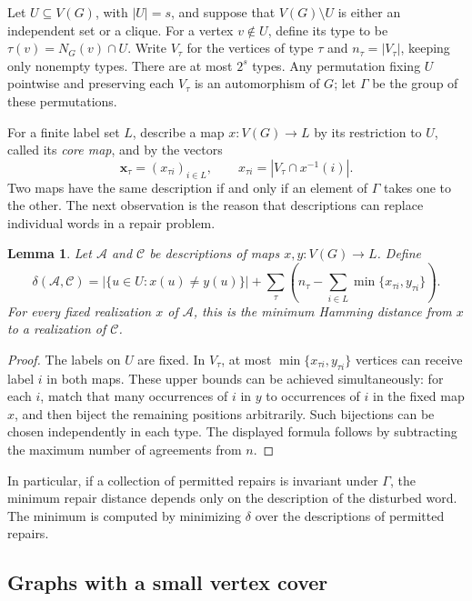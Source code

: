 \documentclass[11pt,reqno]{amsart}
\numberwithin{equation}{section}
\newtheorem{lemma}[theorem]{Lemma}
\theoremstyle{definition}
\theoremstyle{remark}
\begin{document}
Let $U\subseteq V(G)$, with $|U|=s$, and suppose that
$V(G)\setminus U$ is either an independent set or a clique.
For a vertex $v\notin U$, define its type to be
$\tau(v)=N_G(v)\cap U$. Write $V_\tau$ for the vertices of type
$\tau$ and $n_\tau=|V_\tau|$, keeping only nonempty types.
There are at most $2^s$ types. Any permutation fixing $U$ pointwise
and preserving each $V_\tau$ is an automorphism of $G$; let $\Gamma$
be the group of these permutations.

For a finite label set $L$, describe a map $x:V(G)\to L$ by its
restriction to $U$, called its \emph{core map}, and by the vectors
\[
\mathbf x_\tau=(x_{\tau i})_{i\in L},\qquad
x_{\tau i}=|V_\tau\cap x^{-1}(i)|.
\]
Two maps have the same description if and only if an element of
$\Gamma$ takes one to the other. The next observation is the reason
that descriptions can replace individual words in a repair problem.

\begin{lemma}\label{rec:distance}
Let $\mathcal A$ and $\mathcal C$ be descriptions of maps $x,y:V(G)\to L$.
Define
\[
\delta(\mathcal A,\mathcal C)
=|\{u\in U:x(u)\neq y(u)\}|
+\sum_\tau\left(n_\tau-\sum_{i\in L}
\min\{x_{\tau i},y_{\tau i}\}\right).
\]
For every fixed realization $x$ of $\mathcal A$, this is the minimum
Hamming distance from $x$ to a realization of $\mathcal C$.
\end{lemma}
\begin{proof}
The labels on $U$ are fixed. In $V_\tau$, at most
$\min\{x_{\tau i},y_{\tau i}\}$ vertices can receive label $i$ in
both maps. These upper bounds can be achieved simultaneously: for
each $i$, match that many occurrences of $i$ in $y$ to occurrences
of $i$ in the fixed map $x$, and then biject the remaining positions
arbitrarily. Such bijections can be chosen independently in each
type. The displayed formula follows by subtracting the maximum
number of agreements from $n$.
\end{proof}

In particular, if a collection of permitted repairs is invariant
under $\Gamma$, the minimum repair distance depends only on the
description of the disturbed word. The minimum is computed by
minimizing $\delta$ over the descriptions of permitted repairs.

\subsection{Graphs with a small vertex cover}
\end{document}
